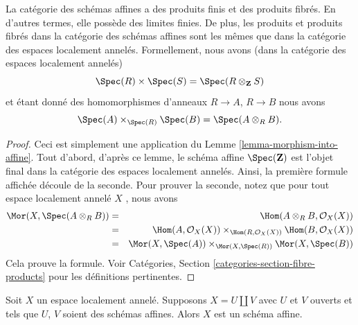 \begin{lemma}
\label{lemma-fibre-product-affine-schemes}
La catégorie des schémas affines a des produits finis et des produits fibrés. En
d'autres termes, elle possède des limites finies. De plus, les produits et
produits fibrés dans la catégorie des schémas affines sont les mêmes que dans la
catégorie des espaces localement annelés. Formellement, nous avons (dans la
catégorie des espaces localement annelés)
$$
\Spec(R) \times \Spec(S) =
\Spec(R \otimes_{\mathbf{Z}} S)
$$
et étant donné des homomorphismes d'anneaux  $R \to A$,  $R \to B$  nous avons
$$
\Spec(A) \times_{\Spec(R)} \Spec(B)
=
\Spec(A \otimes_R B).
$$
\end{lemma}

\begin{proof}
Ceci est simplement une application du Lemme  \ref{lemma-morphism-into-affine}. Tout d'abord, d'après
ce lemme, le schéma affine  $\Spec(\mathbf{Z})$  est l'objet final dans la catégorie des
espaces localement annelés. Ainsi, la première formule affichée découle de la
seconde. Pour prouver la seconde, notez que pour tout espace localement annelé
 $X$ , nous avons
\begin{eqnarray*}
\Mor(X, \Spec(A \otimes_R B))
& = &
\Hom(A \otimes_R B, \mathcal{O}_X(X)) \\
& = &
\Hom(A, \mathcal{O}_X(X))
\times_{\Hom(R, \mathcal{O}_X(X))}
\Hom(B, \mathcal{O}_X(X)) \\
& = &
\Mor(X, \Spec(A))
\times_{\Mor(X, \Spec(R))}
\Mor(X, \Spec(B))
\end{eqnarray*}
Cela prouve la formule. Voir Catégories, Section  \ref{categories-section-fibre-products}  pour les
définitions pertinentes.
\end{proof}

\begin{lemma}
\label{lemma-disjoint-union-affines}
Soit  $X$  un espace localement annelé. Supposons  $X = U \amalg V$  avec
 $U$  et  $V$  ouverts et tels que  $U$,  $V$  soient
des schémas affines. Alors  $X$  est un schéma affine.
\end{lemma}

